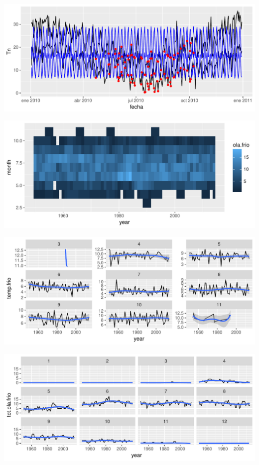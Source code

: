 \documentclass[12pt]{article}\usepackage[]{graphicx}\usepackage[]{color}
\makeatletter
\def\maxwidth{ %
  \ifdim\Gin@nat@width>\linewidth
    \linewidth
  \else
    \Gin@nat@width
  \fi
}
\newenvironment{knitrout}{}{} %
\makeatother
\begin{document}
\begin{knitrout}
\color{fgcolor}

{\centering \includegraphics[width=\maxwidth]{figure/popurri-1} 

}




{\centering \includegraphics[width=\maxwidth]{figure/popurri-2} 

}




{\centering \includegraphics[width=\maxwidth]{figure/popurri-3} 

}




{\centering \includegraphics[width=\maxwidth]{figure/popurri-4} 

}



\end{knitrout}
\end{document}
